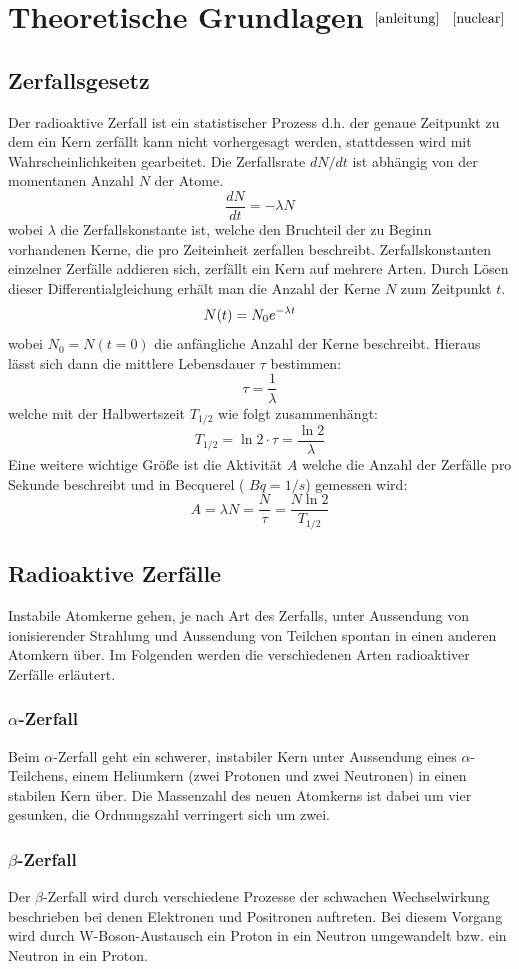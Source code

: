 \documentclass[12pt]{article}
\begin{document}
\newpage
\section[Theoretische Grundlagen]{Theoretische Grundlagen $^{\cite{anleitung}}$ $^{\cite{nuclear}}$}
\subsection{Zerfallsgesetz}\label{zerfallsgesetz}
Der radioaktive Zerfall ist ein statistischer Prozess d.h. der genaue Zeitpunkt zu dem ein Kern zerfällt kann nicht vorhergesagt werden, stattdessen wird mit Wahrscheinlichkeiten gearbeitet. Die Zerfallsrate $dN/dt$ ist abhängig von der momentanen Anzahl $N$ der Atome.
\[\frac{dN}{dt}=-\lambda N\]
wobei $\lambda$ die Zerfallskonstante ist, welche den Bruchteil der zu Beginn vorhandenen Kerne, die pro Zeiteinheit zerfallen beschreibt. Zerfallskonstanten einzelner Zerfälle addieren sich, zerfällt ein Kern auf mehrere Arten. Durch Lösen dieser Differentialgleichung erhält man die Anzahl der Kerne $N$ zum Zeitpunkt $t$.
\[N(t)=N_0e^{-\lambda t}\hspace{0.5cm}\]
wobei $N_0=N(t=0)$ die anfängliche Anzahl der Kerne beschreibt. Hieraus lässt sich dann die mittlere Lebensdauer $\tau$ bestimmen:
\[\tau=\frac{1}{\lambda}\]
welche mit der Halbwertszeit $T_{1/2}$ wie folgt zusammenhängt:
\[T_{1/2} = \ln2\cdot \tau = \frac{\ln2}{\lambda}\]
Eine weitere wichtige Größe ist die Aktivität $A$ welche die Anzahl der Zerfälle pro Sekunde beschreibt und in Becquerel ( $Bq=1/s$) gemessen wird:
\[A = \lambda N = \frac{N}{\tau} = \frac{N\ln2}{T_{1/2}}\]
\subsection{Radioaktive Zerfälle}
Instabile Atomkerne gehen, je nach Art des Zerfalls, unter Aussendung von ionisierender Strahlung und Aussendung von Teilchen spontan in einen anderen Atomkern über. Im Folgenden werden die verschiedenen Arten radioaktiver Zerfälle erläutert.
\subsubsection{$\alpha$-Zerfall}
Beim $\alpha$-Zerfall geht ein schwerer, instabiler Kern unter Aussendung eines $\alpha$-Teilchens, einem Heliumkern (zwei Protonen und zwei Neutronen) in einen stabilen Kern über. Die Massenzahl des neuen Atomkerns ist dabei um vier gesunken, die Ordnungszahl verringert sich um zwei.
\subsubsection{$\beta$-Zerfall}
Der $\beta$-Zerfall wird durch verschiedene Prozesse der schwachen Wechselwirkung beschrieben bei denen Elektronen  und Positronen auftreten. Bei diesem Vorgang wird durch W-Boson-Austausch ein Proton in ein Neutron umgewandelt bzw. ein Neutron in ein Proton.
\end{document}
